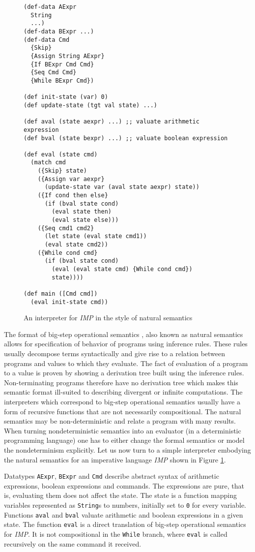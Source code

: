 \begin{figure}[ht!]
\begin{lstlisting}
(def-data AExpr
  String
  ...)
(def-data BExpr ...)
(def-data Cmd
  {Skip}
  {Assign String AExpr}
  {If BExpr Cmd Cmd}
  {Seq Cmd Cmd}
  {While BExpr Cmd})

(def init-state (var) 0)
(def update-state (tgt val state) ...)

(def aval (state aexpr) ...) ;; valuate arithmetic expression
(def bval (state bexpr) ...) ;; valuate boolean expression

(def eval (state cmd)
  (match cmd
    ({Skip} state)
    ({Assign var aexpr}
      (update-state var (aval state aexpr) state))
    ({If cond then else}
      (if (bval state cond)
        (eval state then)
        (eval state else)))
    ({Seq cmd1 cmd2}
      (let state (eval state cmd1))
      (eval state cmd2))
    ({While cond cmd}
      (if (bval state cond)
        (eval (eval state cmd) {While cond cmd})
        state))))

(def main ([Cmd cmd])
  (eval init-state cmd))
\end{lstlisting}
\caption{An interpreter for \textit{IMP} in the style of natural semantics}
\label{fig:evaluator-imp}
\end{figure}

The format of big-step operational semantics \cite{kahn-natural-semantics}, also known as natural semantics allows for specification of behavior of programs using inference rules.
These rules usually decompose terms syntactically and give rise to a relation between programs and values to which they evaluate.
The fact of evaluation of a program to a value is proven by showing a derivation tree built using the inference rules.
Non-terminating programs therefore have no derivation tree which makes this semantic format ill-suited to describing divergent or infinite computations.
The interpreters which correspond to big-step operational semantics usually have a form of recursive functions that are not necessarily compositional.
The natural semantics may be non-deterministic and relate a program with many results.
When turning nondeterministic semantics into an evaluator (in a deterministic programming language) one has to either change the formal semantics or model the nondeterminism explicitly.
Let us now turn to a simple interpreter embodying the natural semantics for an imperative language \textit{IMP} shown in Figure \ref{fig:evaluator-imp}.

Datatypes \lstinline!AExpr!, \lstinline!BExpr! and \lstinline!Cmd! describe abstract syntax of arithmetic expressions, boolean expressions and commands.
The expressions are pure, that is, evaluating them does not affect the state.
The state is a function mapping variables represented as \lstinline!String!s to numbers, initially set to \lstinline!0! for every variable.
Functions \lstinline!aval! and \lstinline!bval! valuate arithmetic and boolean expressions in a given state.
The function \lstinline!eval! is a direct translation of big-step operational semantics for \textit{IMP}.
It is not compositional in the \lstinline!While! branch, where \lstinline!eval! is called recursively on the same command it received.

